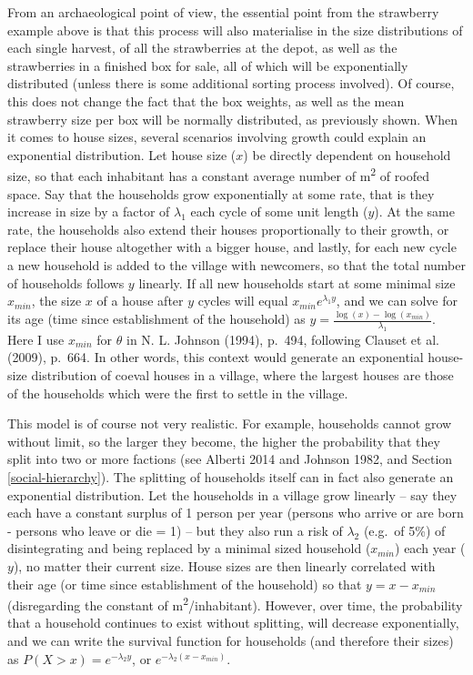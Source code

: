 \documentclass[
  12pt,
]{book}
\begin{document}
From an archaeological point of view, the essential point from the strawberry example above is that this process will also materialise in the size distributions of each single harvest, of all the strawberries at the depot, as well as the strawberries in a finished box for sale, all of which will be exponentially distributed (unless there is some additional sorting process involved). Of course, this does not change the fact that the box weights, as well as the mean strawberry size per box will be normally distributed, as previously shown. When it comes to house sizes, several scenarios involving growth could explain an exponential distribution. Let house size (\(x\)) be directly dependent on household size, so that each inhabitant has a constant average number of m\textsuperscript{2} of roofed space. Say that the households grow exponentially at some rate, that is they increase in size by a factor of \(\lambda_1\) each cycle of some unit length (\(y\)). At the same rate, the households also extend their houses proportionally to their growth, or replace their house altogether with a bigger house, and lastly, for each new cycle a new household is added to the village with newcomers, so that the total number of households follows \(y\) linearly. If all new households start at some minimal size \(x_{min}\), the size \(x\) of a house after \(y\) cycles will equal \(x_{min}e^{\lambda_1 y}\), and we can solve for its age (time since establishment of the household) as \(y = \frac{\log(x)-\log(x_{min})}{\lambda_1}\). Here I use \(x_{min}\) for \(\theta\) in N. L. Johnson (1994), p.~494, following Clauset et al. (2009), p.~664. In other words, this context would generate an exponential house-size distribution of coeval houses in a village, where the largest houses are those of the households which were the first to settle in the village.

This model is of course not very realistic. For example, households cannot grow without limit, so the larger they become, the higher the probability that they split into two or more factions (see Alberti 2014 and Johnson 1982, and Section \ref{social-hierarchy}). The splitting of households itself can in fact also generate an exponential distribution. Let the households in a village grow linearly -- say they each have a constant surplus of 1 person per year (persons who arrive or are born - persons who leave or die = 1) -- but they also run a risk of \(\lambda_2\) (e.g.~of 5\%) of disintegrating and being replaced by a minimal sized household (\(x_{min}\)) each year (\(y\)), no matter their current size. House sizes are then linearly correlated with their age (or time since establishment of the household) so that \(y = x - x_{min}\) (disregarding the constant of m\textsuperscript{2}/inhabitant). However, over time, the probability that a household continues to exist without splitting, will decrease exponentially, and we can write the survival function for households (and therefore their sizes) as \(P(X > x) = e^{-\lambda_2 y}\), or \(e^{-\lambda_2 (x-x_{min})}\).
\end{document}
